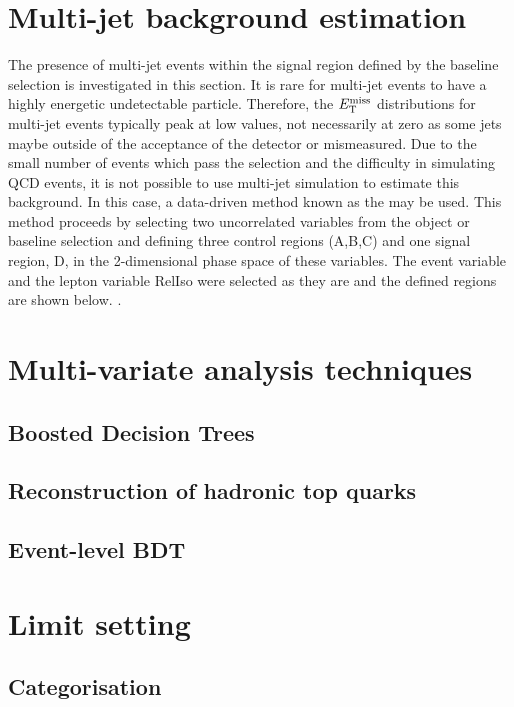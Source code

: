 \section{Multi-jet background estimation}
\label{sec:QCDbackground}
The presence of multi-jet events within the signal region defined by the baseline selection is investigated in this section. It is rare for multi-jet events to have a highly energetic undetectable particle. Therefore, the $E_{\mathrm{T}}^{\text{miss}}$ distributions for multi-jet events typically peak at low values, not necessarily at zero as some jets maybe outside of the acceptance of the detector or mismeasured. Due to the small number of events which pass the selection and the difficulty in simulating QCD events, it is not possible to use multi-jet simulation to estimate this background. In this case, a data-driven method known as the  may be used. This method proceeds by selecting two uncorrelated variables from the object or baseline selection and defining three control regions (A,B,C) and one signal region, D, in the 2-dimensional phase space of these variables. The event variable \MET and the lepton variable RelIso were selected as they are  and the defined regions are shown below. .\\


\section{Multi-variate analysis techniques}
\subsection{Boosted Decision Trees}
\label{sec:BDT}


\subsection{Reconstruction of hadronic top quarks}

\subsection{Event-level BDT}

\section{Limit setting}

\subsection{Categorisation}
\label{sec:Cats}




